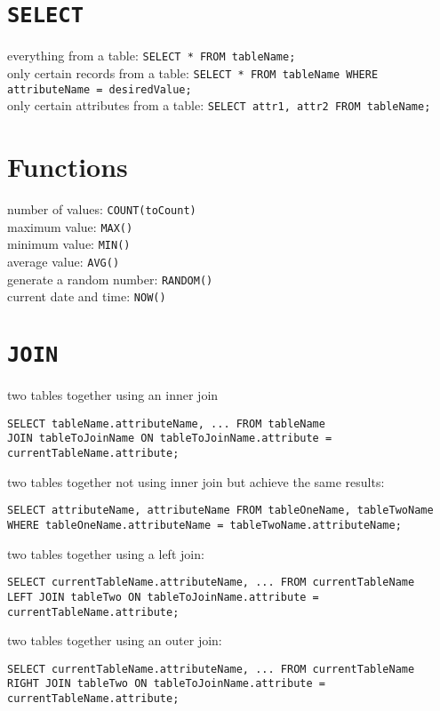 \documentclass[a4paper,11pt]{article}
\begin{document}
\section{\texttt{SELECT}}
everything from a table: \verb|SELECT * FROM tableName;|\\
only certain records from a table: \verb|SELECT * FROM tableName WHERE attributeName = desiredValue;|\\
only certain attributes from a table: \verb|SELECT attr1, attr2 FROM tableName;|

\section{Functions}
number of values: \verb|COUNT(toCount)|\\
maximum value: \verb|MAX()|\\
minimum value: \verb|MIN()|\\
average value: \verb|AVG()|\\
generate a random number: \verb|RANDOM()|\\
current date and time: \verb|NOW()|

\section{\texttt{JOIN}}
two tables together using an inner join
\begin{verbatim}
SELECT tableName.attributeName, ... FROM tableName
JOIN tableToJoinName ON tableToJoinName.attribute = currentTableName.attribute;
\end{verbatim}
two tables together not using inner join but achieve the same results:
\begin{verbatim}
SELECT attributeName, attributeName FROM tableOneName, tableTwoName
WHERE tableOneName.attributeName = tableTwoName.attributeName;
\end{verbatim}

two tables together using a left join:
\begin{verbatim}
SELECT currentTableName.attributeName, ... FROM currentTableName
LEFT JOIN tableTwo ON tableToJoinName.attribute = currentTableName.attribute;
\end{verbatim}

two tables together using an outer join:
\begin{verbatim}
SELECT currentTableName.attributeName, ... FROM currentTableName
RIGHT JOIN tableTwo ON tableToJoinName.attribute = currentTableName.attribute;
\end{verbatim}
\end{document}
